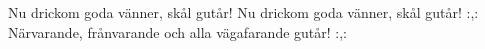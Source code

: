 

\beginverse*
Nu drickom goda vänner, skål gutår!
Nu drickom goda vänner, skål gutår!
:,: Närvarande, frånvarande och alla vägafarande gutår! :,:
\endverse
\endsong